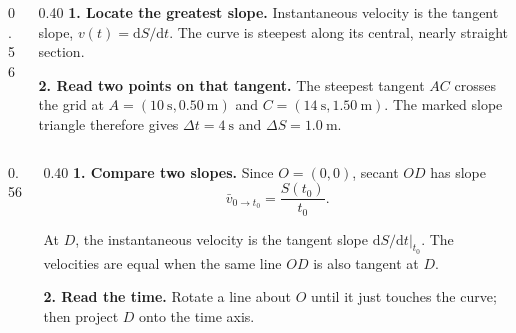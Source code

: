 \begin{solutionframe}
  \begin{columns}[T,onlytextwidth]
    \begin{column}{0.56\textwidth}
      \centering
      \begingroup
        \def\showmaxtangent{1}
        \resizebox{\textwidth}{!}{}
      \endgroup
    \end{column}
    \begin{column}{0.40\textwidth}
      \footnotesize
      \textbf{1. Locate the greatest slope.} Instantaneous velocity is the
      tangent slope, $v(t)=\mathrm{d}S/\mathrm{d}t$. The curve is steepest
      along its central, nearly straight section.

      \textbf{2. Read two points on that tangent.} The steepest tangent $AC$
      crosses the grid at $A=(\SI{10}{\second},\SI{0.50}{\metre})$ and
      $C=(\SI{14}{\second},\SI{1.50}{\metre})$. The marked slope triangle
      therefore gives $\Delta t=\SI{4}{\second}$ and
      $\Delta S=\SI{1.0}{\metre}$.
    \end{column}
  \end{columns}
\end{solutionframe}

\begin{solutionframe}
  \begin{columns}[T,onlytextwidth]
    \begin{column}{0.56\textwidth}
      \centering
      \begingroup
        \def\showequaltangent{1}
        \resizebox{\textwidth}{!}{}
      \endgroup
    \end{column}
    \begin{column}{0.40\textwidth}
      \footnotesize
      \textbf{1. Compare two slopes.} Since $O=(0,0)$, secant $OD$ has slope
      \[
        \bar v_{0\to t_0}=\frac{S(t_0)}{t_0}.
      \]

      At $D$, the instantaneous velocity is the tangent slope
      $\left.\mathrm{d}S/\mathrm{d}t\right|_{t_0}$. The velocities are equal
      when the same line $OD$ is also tangent at $D$.

      \textbf{2. Read the time.} Rotate a line about $O$ until it just touches
      the curve; then project $D$ onto the time axis.
    \end{column}
  \end{columns}
\end{solutionframe}

